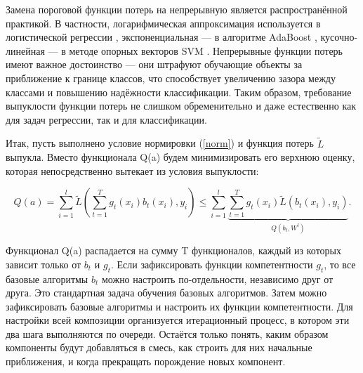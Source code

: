 \documentclass{article}
\begin{document}
Замена пороговой функции потерь на непрерывную является распространённой практикой. В частности, логарифмическая аппроксимация используется в логистической регрессии , экспоненциальная — в алгоритме AdaBoost , кусочно-линейная — в методе опорных векторов SVM . Непрерывные функции потерь имеют важное достоинство — они штрафуют обучающие объекты за приближение к границе классов, что способствует увеличению зазора между классами и повышению надёжности классификации. Таким образом, требование выпуклости функции потерь не слишком обременительно и даже естественно как для задач регрессии, так и для классификации.

Итак, пусть выполнено условие нормировки (\ref{norm}) и функция потерь $\widetilde{L}$ выпукла. Вместо функционала Q(a) будем минимизировать его верхнюю оценку, которая непосредственно вытекает из условия выпуклости:

\begin{equation}
    Q(a) = \sum_{i=1}^{l} \widetilde{L}(\sum_{t=1}^{T} g_{t}(x_{i})b_{t}(x_{i}), y_{i}) \leq \sum_{i=1}^{l}\underbrace{\sum_{t=1}^{T} g_{t}(x_{i}) \widetilde{L}(b_{t}(x_{i}), y_{i})}_{Q(b_{t},W^{l})}.
    \label{qa}
\end{equation}


Функционал Q(a) распадается на сумму T функционалов, каждый из которых зависит только от $b_{t}$ и $g_{t}$. Если зафиксировать функции компетентности $g_{t}$, то все базовые алгоритмы $b_{t}$ можно настроить по-отдельности, независимо друг от друга. Это стандартная задача обучения базовых алгоритмов. Затем можно зафиксировать базовые алгоритмы и настроить их функции компетентности. Для настройки всей композиции организуется итерационный процесс, в котором эти два шага выполняются по очереди. Остаётся только понять, каким образом компоненты будут добавляться в смесь, как строить для них начальные приближения, и когда прекращать порождение новых компонент.
\end{document}
